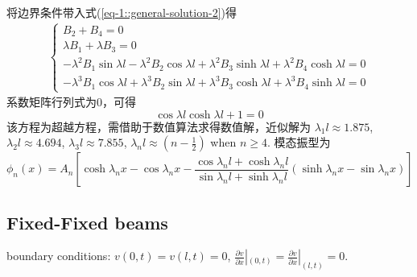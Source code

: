 将边界条件带入式(\ref{eq-1::general-solution-2})得
\begin{equation}
    \begin{aligned}
        \left\{\begin{array}{l}
            B_{2} + B_{4} = 0\\
            \lambda B_{1} + \lambda B_{3} = 0\\
            -\lambda^{2}B_{1}\sin \lambda l - \lambda^{2}B_{2}\cos \lambda l + \lambda^{2}B_{3}\sinh \lambda l + \lambda^{2}B_{4}\cosh \lambda l= 0\\
            -\lambda^{3}B_{1}\cos \lambda l + \lambda^{3}B_{2}\sin \lambda l + \lambda^{3}B_{3}\cosh \lambda l + \lambda^{3}B_{4}\sinh \lambda l= 0
        \end{array}\right.
    \end{aligned}
\end{equation}
系数矩阵行列式为0，可得
\begin{equation}
    \cos \lambda l \cosh \lambda l +1=0
\end{equation}
该方程为超越方程，需借助于数值算法求得数值解，近似解为
$\lambda_{1}l\approx1.875$, $\lambda_{2}l\approx4.694$, $\lambda_{3}l\approx 7.855$, 
$\lambda_{n}l\approx\left(n-\frac{1}{2}\right)$ when $n\ge 4$.
模态振型为
\begin{equation}
    \phi_{n}(x)=A_{n}\left[\cosh\lambda_{n}x - \cos\lambda_{n}x - 
    \frac{\cos\lambda_{n}l + \cosh\lambda_{n}l}{\sin\lambda_{n}l + \sinh\lambda_{n}l}
    \left(\sinh\lambda_{n}x - \sin\lambda_{n}x\right)\right]    
\end{equation}

\subsection{Fixed-Fixed beams}

boundary conditions: $v(0,t)=v(l,t)=0$, 
$\frac{\partial v}{\partial x}|_{(0,t)}=\frac{\partial v}{\partial x}|_{(l,t)}=0$. 

